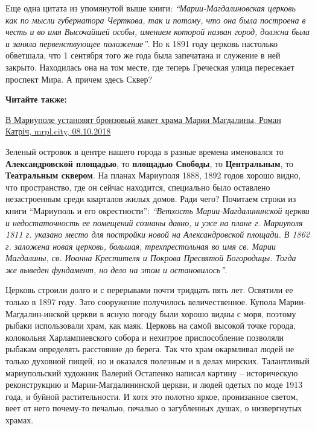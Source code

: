 Еще одна цитата из упомянутой  выше книги: \emph{\enquote{Марии-Магдалиновская церковь как по
мысли губернатора Черткова, так и потому, что она была построена в честь и во
имя Высочайшей особы, имением которой назван город, должна была и заняла
первенствующее положение}}. Но к 1891 году церковь настолько обветшала, что 1
сентября того же года была запечатана и служение в ней закрыто. Находилась она
на том месте, где теперь Греческая улица пересекает проспект Мира. А причем
здесь Сквер?

\textbf{Читайте также:} 

\href{https://mrpl.city/news/view/v-mariupole-ustanovyat-bronzovyj-maket-hrama-marii-magdaliny-foto}{%
В Мариуполе установят бронзовый макет храма Марии Магдалины, Роман Катріч, mrpl.city, 08.10.2018}


Зеленый островок в центре нашего города в разные времена именовался то
\textbf{Александровской площадью}, то \textbf{площадью Свободы}, то \textbf{Центральным}, то \textbf{Театральным
сквером}. На планах Мариуполя 1888, 1892 годов хорошо видно, что пространство,
где он сейчас находится, специально было оставлено незастроенным среди
кварталов жилых домов. Ради чего? Почитаем строки из  книги \enquote{Мариуполь и его
окрестности}: \emph{\enquote{Ветхость Марии-Магдалининской церкви и недостаточность ее
помещений сознаны давно, и уже на плане г. Мариуполя 1811 г. указано место для
постройки новой на Александровской площади. В 1862 г. заложена новая церковь,
большая, трехпрестольная во имя св. Марии Магдалины, св. Иоанна Крестителя и
Покрова Пресвятой Богородицы. Тогда же выведен фундамент, но дело на этом и
остановилось}}.


Церковь строили долго и с перерывами почти тридцать пять лет. Освятили ее
только в 1897 году. Зато сооружение получилось величественное. Купола
Марии-Магдалин\hyp{}инской церкви в ясную погоду были хорошо видны с моря, поэтому
рыбаки использовали храм, как маяк.  Церковь на самой высокой точке города,
колокольня Харлампиевского собора и нехитрое приспособление позволяли рыбакам
определять расстояние до берега. Так что храм окармливал людей не только
духовной пищей, но и оказался полезным и в делах мирских. Талантливый
мариупольский художник Валерий Остапенко написал картину – историческую
реконструкцию и Марии-Магдалининской церкви, и людей одетых по моде 1913 года,
и буйной растительности. И хотя это полотно яркое, пронизанное светом, веет от
него почему-то  печалью, печалью о загубленных душах, о низвергнутых храмах.


